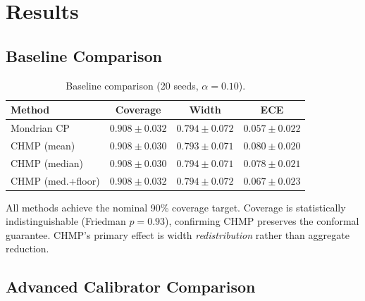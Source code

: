 \documentclass[twoside,11pt]{article}
\begin{document}
\section{Results}
\label{sec:results}

\subsection{Baseline Comparison}

\begin{table}[ht]
\centering
\caption{Baseline comparison (20 seeds, $\alpha = 0.10$).}
\label{tab:baseline}
\begin{tabular}{lccc}
\toprule
Method & Coverage & Width & ECE \\
\midrule
Mondrian CP & $0.908 \pm 0.032$ & $0.794 \pm 0.072$ & $0.057 \pm 0.022$ \\
CHMP (mean) & $0.908 \pm 0.030$ & $0.793 \pm 0.071$ & $0.080 \pm 0.020$ \\
CHMP (median) & $0.908 \pm 0.030$ & $0.794 \pm 0.071$ & $0.078 \pm 0.021$ \\
CHMP (med.+floor) & $0.908 \pm 0.032$ & $0.794 \pm 0.072$ & $0.067 \pm 0.023$ \\
\bottomrule
\end{tabular}
\end{table}

All methods achieve the nominal 90\% coverage target. Coverage is
statistically indistinguishable (Friedman $p = 0.93$), confirming CHMP
preserves the conformal guarantee. CHMP's primary effect is width
\emph{redistribution} rather than aggregate reduction.

\subsection{Advanced Calibrator Comparison}
\end{document}
